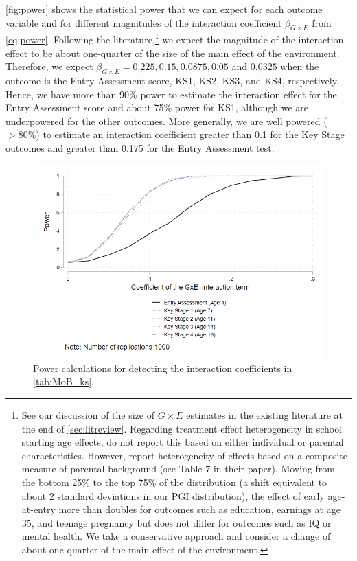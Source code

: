 \documentclass[12pt,a4paper]{article}
\begin{document}
\begin{bibunit}
\autoref{fig:power} shows the statistical power that we can expect for each outcome variable and for different magnitudes of the interaction coefficient $\beta_{G \times E}$ from \autoref{eq:power}. Following the literature,\footnote{See our discussion of the size of $G \times E$ estimates in the existing literature at the end of \autoref{sec:litreview}. Regarding treatment effect heterogeneity in school starting age effects, \cite{Crawford2010} do not report this based on either individual or parental characteristics. However, \cite{Black2011} report heterogeneity of effects based on a composite measure of parental background (see Table 7 in their paper). Moving from the bottom 25\% to the top 75\% of the distribution (a shift equivalent to about 2 standard deviations in our PGI distribution), the effect of early age-at-entry more than doubles for outcomes such as education, earnings at age 35, and teenage pregnancy but does not differ for outcomes such as IQ or mental health. We take a conservative approach and consider a change of about one-quarter of the main effect of the environment.} %
we expect the magnitude of the interaction effect to be about one-quarter of the size of the main effect of the environment. Therefore, we expect $\beta_{G \times E}=0.225, 0.15, 0.0875, 0.05$ and $0.0325$ when the outcome is the Entry Assessment score, KS1, KS2, KS3, and KS4, respectively. Hence, we have more than 90\% power to estimate the interaction effect for the Entry Assessment score and about 75\% power for KS1, although we are underpowered for the other outcomes.
More generally, we are well powered ($>80\%$) to estimate an interaction coefficient greater than 0.1 for the Key Stage outcomes and greater than 0.175 for the Entry Assessment test. 

\begin{figure}[H]
\centering 
\includegraphics[width=0.7\linewidth]{include/power.png}
\caption{Power calculations for detecting the interaction coefficients in \autoref{tab:MoB_ks}.}
\label{fig:power}
\end{figure}


\end{bibunit}
\end{document}
